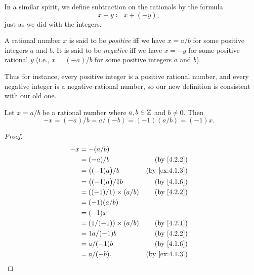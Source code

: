 \begin{note}
  In a similar spirit, we define subtraction on the rationals by the formula
  \[
    x - y \coloneqq x + (-y),
  \]
  just as we did with the integers.
\end{note}

\begin{defn}\label{4.2.6}
  A rational number \(x\) is said to be \emph{positive} iff we have \(x = a / b\) for some positive integers \(a\) and \(b\).
  It is said to be \emph{negative} iff we have \(x = -y\) for some positive rational \(y\)
  (i.e., \(x = (-a) / b\) for some positive integers \(a\) and \(b\)).
\end{defn}

\begin{note}
  Thus for instance, every positive integer is a positive rational number, and every negative integer is a negative rational number, so our new definition is consistent with our old one.
\end{note}

\begin{ac}\label{ac:4.2.3}
  Let \(x = a / b\) be a rational number where \(a, b \in \mathbb{Z}\) and \(b \neq 0\).
  Then
  \[
    -x = (-a) / b = a / (-b) = (-1)(a / b) = (-1)x.
  \]
\end{ac}

\begin{proof}
  \begin{align*}
    -x & = -(a / b)                                                \\
       & = (-a) / b                  & \text{(by \cref{4.2.2})}    \\
       & = \big((-1)a\big) / b       & \text{(by \cref{ex:4.1.3})} \\
       & = \big((-1)a\big) / 1b      & \text{(by \cref{4.1.6})}    \\
       & = ((-1) / 1) \times (a / b) & \text{(by \cref{4.2.2})}    \\
       & = (-1)(a / b)                                             \\
       & = (-1)x                                                   \\
       & = (1 / (-1)) \times (a / b) & \text{(by \cref{4.2.1})}    \\
       & = 1a / (-1)b                & \text{(by \cref{4.2.2})}    \\
       & = a / (-1)b                 & \text{(by \cref{4.1.6})}    \\
       & = a / (-b).                 & \text{(by \cref{ex:4.1.3})}
  \end{align*}
\end{proof}


